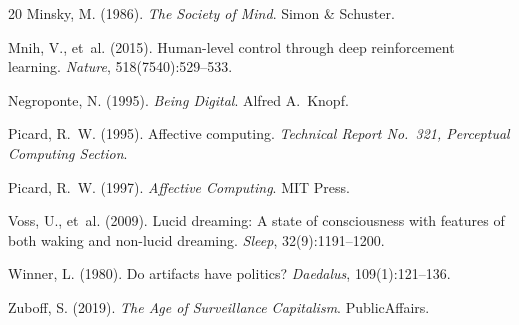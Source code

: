 \documentclass[11pt,a4paper]{article}
\begin{document}
\begin{thebibliography}{20}
Minsky, M. (1986).
\newblock \emph{The Society of Mind}.
\newblock Simon \& Schuster.

Mnih, V., et~al. (2015).
\newblock Human-level control through deep reinforcement learning.
\newblock \emph{Nature}, 518(7540):529--533.

Negroponte, N. (1995).
\newblock \emph{Being Digital}.
\newblock Alfred A.~Knopf.

Picard, R.~W. (1995).
\newblock Affective computing.
\newblock \emph{Technical Report No.~321, Perceptual Computing Section}.

Picard, R.~W. (1997).
\newblock \emph{Affective Computing}.
\newblock MIT Press.

Voss, U., et~al. (2009).
\newblock Lucid dreaming: A state of consciousness with features of both waking and non-lucid dreaming.
\newblock \emph{Sleep}, 32(9):1191--1200.

Winner, L. (1980).
\newblock Do artifacts have politics?
\newblock \emph{Daedalus}, 109(1):121--136.

Zuboff, S. (2019).
\newblock \emph{The Age of Surveillance Capitalism}.
\newblock PublicAffairs.

\end{thebibliography}
\end{document}
